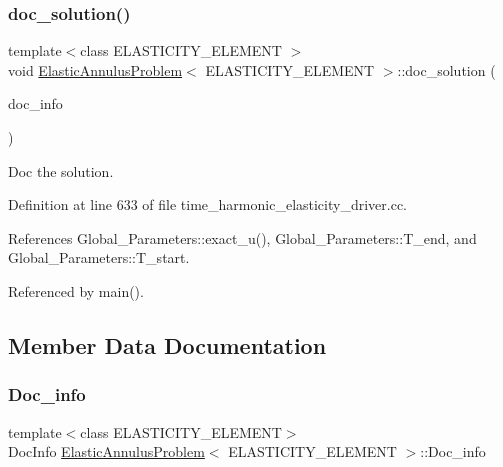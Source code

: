 \subsubsection{\texorpdfstring{doc\+\_\+solution()}{doc\_solution()}\hspace{0.1cm}{\footnotesize\ttfamily [2/2]}}
{\footnotesize\ttfamily template$<$class E\+L\+A\+S\+T\+I\+C\+I\+T\+Y\+\_\+\+E\+L\+E\+M\+E\+NT $>$ \\
void \hyperlink{classElasticAnnulusProblem}{Elastic\+Annulus\+Problem}$<$ E\+L\+A\+S\+T\+I\+C\+I\+T\+Y\+\_\+\+E\+L\+E\+M\+E\+NT $>$\+::doc\+\_\+solution (\begin{DoxyParamCaption}\item[{Doc\+Info \&}]{doc\+\_\+info }\end{DoxyParamCaption})}



Doc the solution. 



Definition at line 633 of file time\+\_\+harmonic\+\_\+elasticity\+\_\+driver.\+cc.



References Global\+\_\+\+Parameters\+::exact\+\_\+u(), Global\+\_\+\+Parameters\+::\+T\+\_\+end, and Global\+\_\+\+Parameters\+::\+T\+\_\+start.



Referenced by main().



\subsection{Member Data Documentation}
\mbox{\label{classElasticAnnulusProblem_a7d98599c2867fda5aab1719292c4623d}} 
\subsubsection{\texorpdfstring{Doc\+\_\+info}{Doc\_info}}
{\footnotesize\ttfamily template$<$class E\+L\+A\+S\+T\+I\+C\+I\+T\+Y\+\_\+\+E\+L\+E\+M\+E\+NT$>$ \\
Doc\+Info \hyperlink{classElasticAnnulusProblem}{Elastic\+Annulus\+Problem}$<$ E\+L\+A\+S\+T\+I\+C\+I\+T\+Y\+\_\+\+E\+L\+E\+M\+E\+NT $>$\+::Doc\+\_\+info\hspace{0.3cm}{\ttfamily [private]}}



